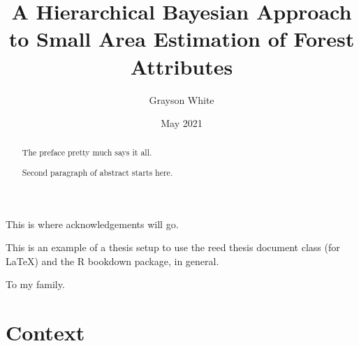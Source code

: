 \documentclass[12pt,twoside]{reedthesis}
\title{A Hierarchical Bayesian Approach to Small Area Estimation of Forest Attributes}
\author{Grayson White}
\date{May 2021}
\begin{document}
  \maketitle

\frontmatter %
\pagestyle{empty} %
  \begin{acknowledgements}
    This is where acknowledgements will go.
  \end{acknowledgements}
  \begin{preface}
    This is an example of a thesis setup to use the reed thesis document class
    (for LaTeX) and the R bookdown package, in general.
  \end{preface}
  \hypersetup{linkcolor=black}
  \setcounter{secnumdepth}{2}
  \setcounter{tocdepth}{2}
  \tableofcontents

  \listoftables

  \listoffigures
  \begin{abstract}
    The preface pretty much says it all.

    \par

    Second paragraph of abstract starts here.
  \end{abstract}
  \begin{dedication}
    To my family.
  \end{dedication}
\mainmatter %
\pagestyle{fancyplain} %

\hypertarget{context}{%
\chapter{Context}\label{context}}
\end{document}
